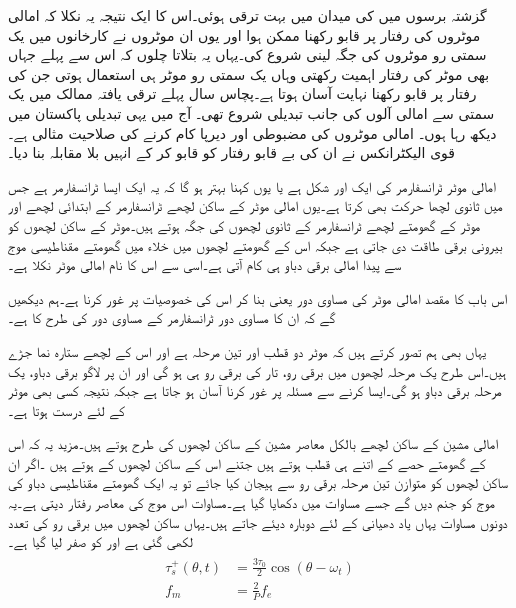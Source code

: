 گزشتہ برسوں میں  کی میدان میں بہت ترقی ہوئی۔اس کا ایک نتیجہ یہ نکلا کہ امالی موٹروں کی رفتار پر قابو رکھنا ممکن ہوا اور یوں ان موٹروں نے کارخانوں میں یک سمتی رو موٹروں کی جگہ لینی شروع کی۔یہاں یہ بتلاتا چلوں کہ اس سے پہلے جہاں بھی موٹر کی رفتار اہمیت رکھتی وہاں یک سمتی رو موٹر ہی استعمال ہوتی جن کی رفتار پر قابو رکھنا نہایت آسان ہوتا ہے۔پچاس سال پہلے ترقی یافتہ ممالک میں یک سمتی سے امالی آلوں کی جانب تبدیلی شروع تھی۔ آج میں یہی تبدیلی پاکستان میں دیکھ رہا ہوں۔ امالی موٹروں کی مضبوطی اور دیرپا کام کرنے کی صلاحیت مثالی ہے۔ قوی الیکٹرانکس نے ان کی بے قابو رفتار کو قابو کر کے انہیں بلا مقابلہ بنا دیا۔

امالی موٹر ٹرانسفارمر کی ایک اور شکل ہے یا یوں کہنا بہتر ہو گا کہ یہ ایک ایسا ٹرانسفارمر ہے جس میں ثانوی لچھا حرکت بھی کرتا ہے۔یوں امالی موٹر کے ساکن لچھے ٹرانسفارمر کے ابتدائی لچھے اور موٹر کے گھومتے لچھے ٹرانسفارمر کے ثانوی لچھوں کی جگہ ہوتے ہیں۔موٹر کے ساکن لچھوں کو بیرونی برقی طاقت دی جاتی ہے جبکہ اس کے گھومتے لچھوں میں خلاء میں گھومتے مقناطیسی موج سے پیدا امالی برقی دباو ہی کام آتی ہے۔اسی سے اس کا نام امالی موٹر نکلا ہے۔

 اس باب کا مقصد امالی موٹر کی مساوی دور یعنی  بنا کر اس کی خصوصیات پر غور کرنا ہے۔ہم دیکھیں گے کہ ان کا مساوی دور ٹرانسفارمر کے مساوی دور کی طرح کا ہے۔

یہاں بھی ہم تصور کرتے ہیں کہ موٹر دو قطب اور تین مرحلہ ہے اور اس کے لچھے ستارہ نما جڑے ہیں۔اس طرح یک مرحلہ لچھوں میں برقی رو، تار کی برقی رو ہی ہو گی اور ان پر لاگو برقی دباو، یک مرحلہ برقی دباو ہو گی۔ایسا کرنے سے مسئلہ پر غور کرنا آسان ہو جاتا ہے جبکہ نتیجہ کسی بھی موٹر کے لئے درست ہوتا ہے۔

امالی مشین کے ساکن لچھے بالکل معاصر مشین کے ساکن لچھوں کی طرح ہوتے ہیں۔مزید یہ کہ اس کے گھومتے حصے کے اتنے ہی قطب ہوتے ہیں جتنے اس کے ساکن لچھوں کے ہوتے ہیں ۔اگر ان ساکن لچھوں کو متوازن تین مرحلہ برقی رو سے ہیجان کیا جائے تو یہ ایک گھومتے مقناطیسی دباو کی موج کو جنم دیں گے جسے مساوات   میں دکھایا گیا ہے۔مساوات   اس موج کی معاصر رفتار دیتی ہے۔یہ دونوں مساوات یہاں یاد دھیانی کے لئے دوبارہ دیئے جاتے ہیں۔یہاں ساکن لچھوں میں برقی رو کی تعدد  لکھی گئی ہے اور  کو صفر لیا گیا ہے۔
\begin{gather}
\begin{aligned}\label{مساوات_امالی_گھومتا_مقناطیسی_دباو_الف}
\tau_s^+ (\theta,t)&=\frac{3 \tau_0}{2} \cos (\theta-\omega_ t)\\
f_m&=\frac{2}{P} f_e
\end{aligned}
\end{gather}

